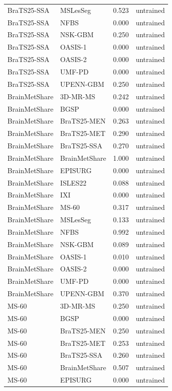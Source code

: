 \begin{tabular}{llrl}
BraTS25-SSA & MSLesSeg & 0.523 & untrained \\
BraTS25-SSA & NFBS & 0.000 & untrained \\
BraTS25-SSA & NSK-GBM & 0.250 & untrained \\
BraTS25-SSA & OASIS-1 & 0.000 & untrained \\
BraTS25-SSA & OASIS-2 & 0.000 & untrained \\
BraTS25-SSA & UMF-PD & 0.000 & untrained \\
BraTS25-SSA & UPENN-GBM & 0.250 & untrained \\
BrainMetShare & 3D-MR-MS & 0.242 & untrained \\
BrainMetShare & BGSP & 0.000 & untrained \\
BrainMetShare & BraTS25-MEN & 0.263 & untrained \\
BrainMetShare & BraTS25-MET & 0.290 & untrained \\
BrainMetShare & BraTS25-SSA & 0.270 & untrained \\
BrainMetShare & BrainMetShare & 1.000 & untrained \\
BrainMetShare & EPISURG & 0.000 & untrained \\
BrainMetShare & ISLES22 & 0.088 & untrained \\
BrainMetShare & IXI & 0.000 & untrained \\
BrainMetShare & MS-60 & 0.317 & untrained \\
BrainMetShare & MSLesSeg & 0.133 & untrained \\
BrainMetShare & NFBS & 0.992 & untrained \\
BrainMetShare & NSK-GBM & 0.089 & untrained \\
BrainMetShare & OASIS-1 & 0.010 & untrained \\
BrainMetShare & OASIS-2 & 0.000 & untrained \\
BrainMetShare & UMF-PD & 0.000 & untrained \\
BrainMetShare & UPENN-GBM & 0.370 & untrained \\
MS-60 & 3D-MR-MS & 0.250 & untrained \\
MS-60 & BGSP & 0.000 & untrained \\
MS-60 & BraTS25-MEN & 0.250 & untrained \\
MS-60 & BraTS25-MET & 0.253 & untrained \\
MS-60 & BraTS25-SSA & 0.260 & untrained \\
MS-60 & BrainMetShare & 0.507 & untrained \\
MS-60 & EPISURG & 0.000 & untrained \\

\end{tabular}
